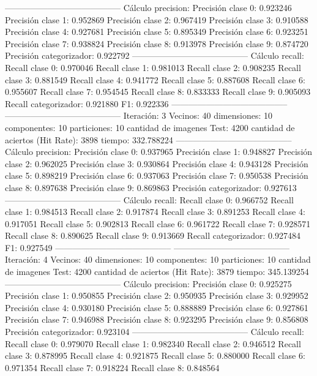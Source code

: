 -----------------------------------------
Cálculo precision: 
Precisión clase 0: 0.923246
Precisión clase 1: 0.952869
Precisión clase 2: 0.967419
Precisión clase 3: 0.910588
Precisión clase 4: 0.927681
Precisión clase 5: 0.895349
Precisión clase 6: 0.923251
Precisión clase 7: 0.938824
Precisión clase 8: 0.913978
Precisión clase 9: 0.874720
Precisión categorizador: 0.922792
-----------------------------------------
Cálculo recall: 
Recall clase 0: 0.970046
Recall clase 1: 0.981013
Recall clase 2: 0.908235
Recall clase 3: 0.881549
Recall clase 4: 0.941772
Recall clase 5: 0.887608
Recall clase 6: 0.955607
Recall clase 7: 0.954545
Recall clase 8: 0.833333
Recall clase 9: 0.905093
Recall categorizador: 0.921880
F1: 0.922336
-----------------------------------------
-----------------------------------------
Iteración: 3
Vecinos: 40
dimensiones: 10
componentes: 10
particiones: 10
cantidad de imagenes Test: 4200
cantidad de aciertos (Hit Rate): 3898
tiempo: 332.788224
-----------------------------------------
Cálculo precision: 
Precisión clase 0: 0.937965
Precisión clase 1: 0.948827
Precisión clase 2: 0.962025
Precisión clase 3: 0.930864
Precisión clase 4: 0.943128
Precisión clase 5: 0.898219
Precisión clase 6: 0.937063
Precisión clase 7: 0.950538
Precisión clase 8: 0.897638
Precisión clase 9: 0.869863
Precisión categorizador: 0.927613
-----------------------------------------
Cálculo recall: 
Recall clase 0: 0.966752
Recall clase 1: 0.984513
Recall clase 2: 0.917874
Recall clase 3: 0.891253
Recall clase 4: 0.917051
Recall clase 5: 0.902813
Recall clase 6: 0.961722
Recall clase 7: 0.928571
Recall clase 8: 0.890625
Recall clase 9: 0.913669
Recall categorizador: 0.927484
F1: 0.927549
-----------------------------------------
-----------------------------------------
Iteración: 4
Vecinos: 40
dimensiones: 10
componentes: 10
particiones: 10
cantidad de imagenes Test: 4200
cantidad de aciertos (Hit Rate): 3879
tiempo: 345.139254
-----------------------------------------
Cálculo precision: 
Precisión clase 0: 0.925275
Precisión clase 1: 0.950855
Precisión clase 2: 0.950935
Precisión clase 3: 0.929952
Precisión clase 4: 0.930180
Precisión clase 5: 0.888889
Precisión clase 6: 0.927861
Precisión clase 7: 0.946988
Precisión clase 8: 0.923295
Precisión clase 9: 0.856808
Precisión categorizador: 0.923104
-----------------------------------------
Cálculo recall: 
Recall clase 0: 0.979070
Recall clase 1: 0.982340
Recall clase 2: 0.946512
Recall clase 3: 0.878995
Recall clase 4: 0.921875
Recall clase 5: 0.880000
Recall clase 6: 0.971354
Recall clase 7: 0.918224
Recall clase 8: 0.848564
